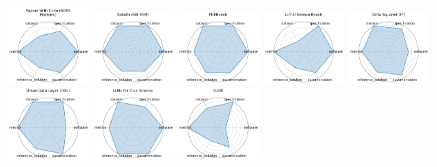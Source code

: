 \begin{figure}[ht!]
\centering
\includegraphics[width=0.1900\textwidth]{images/papers_with_code_sota_platform_radar.pdf}
\includegraphics[width=0.1900\textwidth]{images/sabath_sbi-fair_radar.pdf}
\includegraphics[width=0.1900\textwidth]{images/pdebench_radar.pdf}
\includegraphics[width=0.1900\textwidth]{images/llm-inference-bench_radar.pdf}
\includegraphics[width=0.1900\textwidth]{images/delta_squared-dft_radar.pdf}
\\[1ex]
\includegraphics[width=0.1900\textwidth]{images/urban_data_layer_udl_radar.pdf}
\includegraphics[width=0.1900\textwidth]{images/llms_for_crop_science_radar.pdf}
\includegraphics[width=0.1900\textwidth]{images/dune_radar.pdf}

\end{figure}
